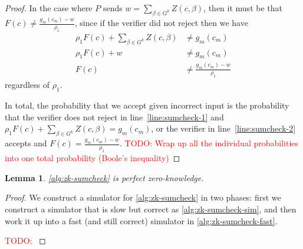 \documentclass[english,12pt]{reedthesis}
\theoremstyle{plain}
\newtheorem{lemma}[lemma]{Lemma}
\theoremstyle{definition}
\theoremstyle{remark}
\newcommand{\TODO}[1]{\textcolor{red}{TODO: #1}}
\begin{document}
\begin{proof}
  In the case where $P$ sends $w = \sum_{\beta \in G^{k}}Z(c, \beta)$, then it must be that
  $F(c) \ne \frac{g_{m}(c_{m})-w}{\rho_{1}}$, since if the verifier did not reject
  then we have
  \begin{align*}
    \rho_{1}F(c) + \sum_{\beta \in G^{k}}Z(c, \beta) &\ne g_{m}(c_{m}) \\
    \rho_{1}F(c) + w &\ne g_{m}(c_{m}) \\
    F(c) &\ne \frac{g_{m}(c_{m})-w}{\rho_{1}}
  \end{align*}
  regardless of $\rho_{1}$.

  In total, the probability that we accept given incorrect input is the
  probability that the verifier does not reject in line~\ref{line:sumcheck-1}
  and $\rho_{1}F(c) + \sum_{\beta \in G^{k}}Z(c, \beta) = g_{m}(c_{m})$, or the verifier in
  line~\ref{line:sumcheck-2} accepts and
  $F(c) = \frac{g_{m}(c_{m}) - w}{\rho_{1}}$. \TODO{Wrap up all the individual
    probabilities into one total probability (Boole's inequality)}
\end{proof}

\begin{lemma}\label{lem:sumcheck-is-pzk}
  \cref{alg:zk-sumcheck} is perfect zero-knowledge.
\end{lemma}

\begin{proof}
  We construct a simulator for \cref{alg:zk-sumcheck} in two phases: first we
  construct a simulator that is slow but correct as \cref{alg:zk-sumcheck-sim},
  and then work it up into a fast (and still correct) simulator in
  \cref{alg:zk-sumcheck-fast}.

  \TODO{}
\end{proof}
\end{document}
